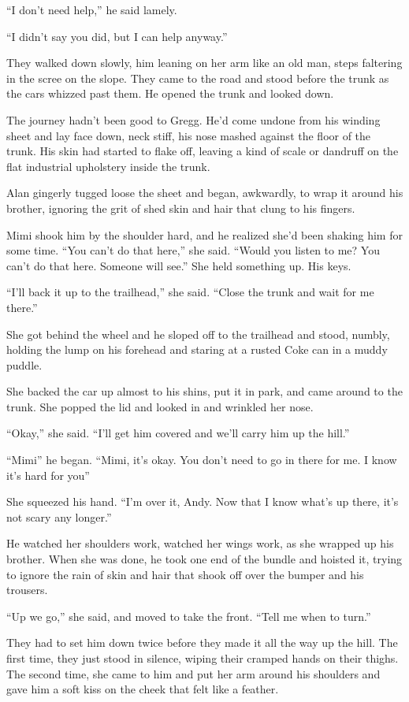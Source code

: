 ``I don't need help,'' he said lamely.

``I didn't say you did, but I can help anyway.''

They walked down slowly, him leaning on her arm like an old man, steps
faltering in the scree on the slope.  They came to the road and stood
before the trunk as the cars whizzed past them.  He opened the trunk
and looked down.

The journey hadn't been good to Gregg.  He'd come undone from his
winding sheet and lay face down, neck stiff, his nose mashed against
the floor of the trunk.  His skin had started to flake off, leaving a
kind of scale or dandruff on the flat industrial upholstery inside the
trunk.

Alan gingerly tugged loose the sheet and began, awkwardly, to wrap it
around his brother, ignoring the grit of shed skin and hair that clung
to his fingers.

Mimi shook him by the shoulder hard, and he realized she'd been
shaking him for some time.  ``You can't do that here,'' she said. 
``Would you listen to me?  You can't do that here.  Someone will
see.'' She held something up.  His keys.

``I'll back it up to the trailhead,'' she said.  ``Close the trunk and
wait for me there.''

She got behind the wheel and he sloped off to the trailhead and stood,
numbly, holding the lump on his forehead and staring at a rusted Coke
can in a muddy puddle.

She backed the car up almost to his shins, put it in park, and came
around to the trunk.  She popped the lid and looked in and wrinkled
her nose.

``Okay,'' she said.  ``I'll get him covered and we'll carry him up the
hill.''

``Mimi\dash{}'' he began.  ``Mimi, it's okay.  You don't need to go in
there for me.  I know it's hard for you\dash{}''

She squeezed his hand.  ``I'm over it, Andy.  Now that I know what's
up there, it's not scary any longer.''

He watched her shoulders work, watched her wings work, as she wrapped
up his brother.  When she was done, he took one end of the bundle and
hoisted it, trying to ignore the rain of skin and hair that shook off
over the bumper and his trousers.

``Up we go,'' she said, and moved to take the front.  ``Tell me when
to turn.''

They had to set him down twice before they made it all the way up the
hill.  The first time, they just stood in silence, wiping their
cramped hands on their thighs.  The second time, she came to him and
put her arm around his shoulders and gave him a soft kiss on the cheek
that felt like a feather.

